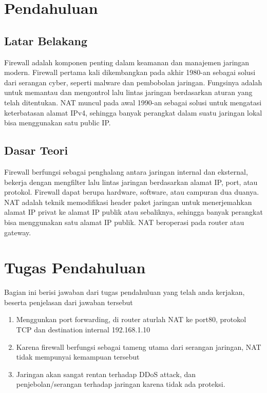 \section{Pendahuluan}
\subsection{Latar Belakang}
Firewall adalah komponen penting dalam keamanan dan manajemen jaringan modern. Firewall pertama kali dikembangkan pada akhir 1980-an sebagai solusi dari serangan cyber, seperti malware dan pembobolan jaringan. Fungsinya adalah untuk memantau dan mengontrol lalu lintas jaringan berdasarkan aturan yang telah ditentukan. NAT muncul pada awal 1990-an sebagai solusi untuk mengatasi keterbatasan alamat IPv4, sehingga banyak perangkat dalam suatu jaringan lokal bisa menggunakan satu public IP.

\subsection{Dasar Teori}
Firewall berfungsi sebagai penghalang antara jaringan internal dan eksternal, bekerja dengan mengfilter lalu lintas jaringan berdasarkan alamat IP, port, atau protokol. Firewall dapat berupa hardware, software, atau campuran dua duanya. NAT adalah teknik memodifikasi header paket jaringan untuk menerjemahkan alamat IP privat ke alamat IP publik atau sebaliknya, sehingga banyak perangkat bisa menggunakan satu alamat IP publik. NAT beroperasi pada router atau gateway.

\section{Tugas Pendahuluan}
Bagian ini berisi jawaban dari tugas pendahuluan yang telah anda kerjakan, beserta penjelasan dari jawaban tersebut
\begin{enumerate}
	\item Menggunkan port forwarding, di router aturlah NAT ke port80, protokol TCP dan destination internal 192.168.1.10
	\item Karena firewall berfungsi sebagai tameng utama dari serangan jaringan, NAT tidak mempunyai kemampuan tersebut
	\item Jaringan akan sangat rentan terhadap DDoS attack, dan penjebolan/serangan terhadap jaringan karena tidak ada proteksi.
\end{enumerate}